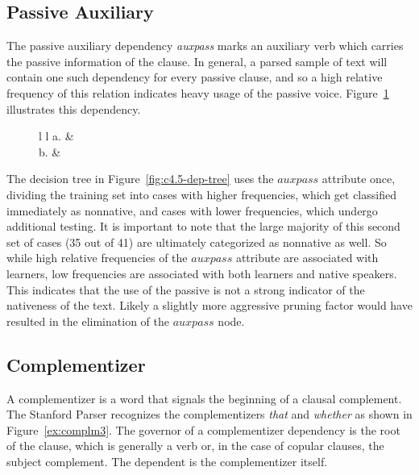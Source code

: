 \documentclass[main.tex]{subfiles}
\begin{document}
\subsection{Passive Auxiliary}

The passive auxiliary dependency \textit{auxpass} marks an auxiliary verb which carries the passive information of the clause. In general, a parsed sample of text will contain one such dependency for every passive clause, and so a high relative frequency of this relation indicates heavy usage of the passive voice. Figure~\ref{ex:auxpass-dep} illustrates this dependency.

\begin{figure}[htbp]
\centering
\begin{tabular}{ l l }
a. & \\
b. & 
\end{tabular}
\label{ex:auxpass-dep}
\end{figure}

The decision tree in Figure~\ref{fig:c4.5-dep-tree} uses the $auxpass$ attribute once, dividing the training set into cases with higher frequencies, which get classified immediately as nonnative, and cases with lower frequencies, which undergo additional testing. It is important to note that the large majority of this second set of cases (35 out of 41) are ultimately categorized as nonnative as well. So while high relative frequencies of the $auxpass$ attribute are associated with learners, low frequencies are associated with both learners and native speakers. This indicates that the use of the passive is not a strong indicator of the nativeness of the text. Likely a slightly more aggressive pruning factor would have resulted in the elimination of the $auxpass$ node.

\subsection{Complementizer}

A complementizer is a word that signals the beginning of a clausal complement. The Stanford Parser recognizes the complementizers \textit{that} and \textit{whether} as shown in Figure~\ref{ex:complm3}. The governor of a complementizer dependency is the root of the clause, which is generally a verb or, in the case of copular clauses, the subject complement. The dependent is the complementizer itself.
\end{document}
